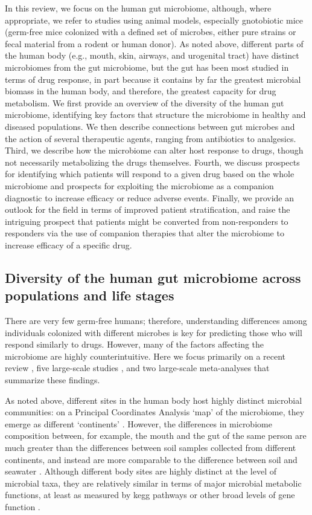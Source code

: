 In this review, we focus on the human gut microbiome, although, where appropriate, we refer to studies using animal models, especially gnotobiotic mice (germ-free mice colonized with a defined set of microbes, either pure strains or fecal material from a rodent or human donor). As noted above, different parts of the human body (e.g., mouth, skin, airways, and urogenital tract) have distinct microbiomes from the gut microbiome, but the gut has been most studied in terms of drug response, in part because it contains by far the greatest microbial biomass in the human body, and therefore, the greatest capacity for drug metabolism. We first provide an overview of the diversity of the human gut microbiome, identifying key factors that structure the microbiome in healthy and diseased populations. We then describe connections between gut microbes and the action of several therapeutic agents, ranging from antibiotics to analgesics. Third, we describe how the microbiome can alter host response to drugs, though not necessarily metabolizing the drugs themselves. Fourth, we discuss prospects for identifying which patients will respond to a given drug based on the whole microbiome and prospects for exploiting the microbiome as a companion diagnostic to increase efficacy or reduce adverse events. Finally, we provide an outlook for the field in terms of improved patient stratification, and raise the intriguing prospect that patients might be converted from non-responders to responders via the use of companion therapies that alter the microbiome to increase efficacy of a specific drug.


\subsection{Diversity of the human gut microbiome across populations and life stages}

There are very few germ-free humans; therefore, understanding differences among individuals colonized with different microbes is key for predicting those who will respond similarly to drugs. However, many of the factors affecting the microbiome are highly counterintuitive. Here we focus primarily on a recent review \cite{RN4057}, five large-scale studies \cite{RN4108, RN4104, RN4107, RN4061, RN4059}, and two large-scale meta-analyses \cite{RN4062, RN4063} that summarize these findings.

As noted above, different sites in the human body host highly distinct microbial communities: on a Principal Coordinates Analysis `map' of the microbiome, they emerge as different `continents' \cite{RN4220, RN4107}. However, the differences in microbiome composition between, for example, the mouth and the gut of the same person are much greater than the differences between soil samples collected from different continents, and instead are more comparable to the difference between soil and seawater \cite{RN4087}. Although different body sites are highly distinct at the level of microbial taxa, they are relatively similar in terms of major microbial metabolic functions, at least as measured by \gls{kegg} pathways or other broad levels of gene function \cite{RN4107, RN4044}.

